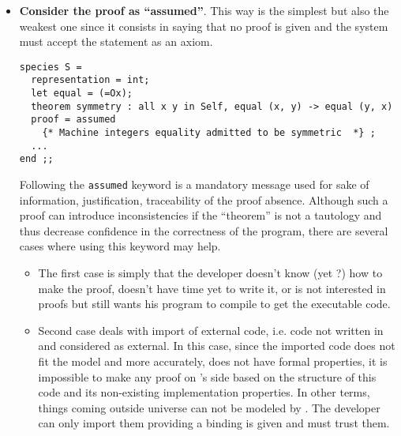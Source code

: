 \begin{itemize}
\item {\bf Consider the proof as ``assumed''}. This way is the
  simplest but also the weakest one since it consists in saying that
  no proof is given and the system must accept the statement as an axiom.
  {\scriptsize
\begin{lstlisting}
species S =
  representation = int;
  let equal = (=Ox);
  theorem symmetry : all x y in Self, equal (x, y) -> equal (y, x)
  proof = assumed
    {* Machine integers equality admitted to be symmetric  *} ;
  ...
end ;;
\end{lstlisting}
}

 Following the {\tt assumed} keyword is a mandatory message used for
sake of information, justification, traceability of the proof
absence. Although such a proof can introduce inconsistencies if the
``theorem'' is not a tautology and thus decrease confidence in the
correctness of the {\focal} program, there are several cases where
using this keyword may help.
  \begin{itemize}
      \item The first case is simply that the developer doesn't know
        (yet ?) how to make the proof, doesn't have time yet to write
        it, or is not interested in proofs but still wants his program to
        compile to get the executable code.

      \item Second case deals with import of external code, i.e. code
        not written in {\focal} and considered as external. In this
        case, since the imported code does not fit the {\focal} model
        and more accurately, does not have formal properties, it is
        impossible to make any proof on {\focal}'s side based on the
        structure of this code and its non-existing implementation
        properties. In other terms, things coming outside {\focal}
        universe can not be modeled by {\focal}. The developer can only
        import them providing a binding is given and must trust them.


\end{itemize}
\end{itemize}
